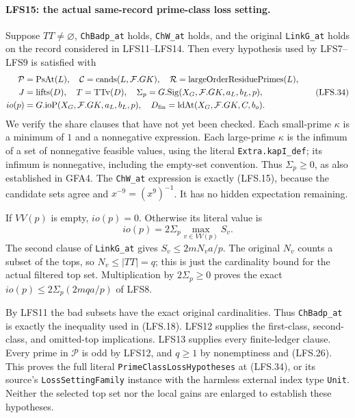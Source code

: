 \paragraph{LFS15: the actual same-record prime-class loss setting.}
\label{claim:LFS15}
Suppose $TT\ne\varnothing$, \texttt{ChBadp\_at} holds,
\texttt{ChW\_at} holds, and the original \texttt{LinkG\_at}
holds on the record considered in LFS11--LFS14.
Then every hypothesis used by LFS7--LFS9 is satisfied with
\[
 \begin{split}
 \mathcal P&=\mathrm{PsAt}(L),\quad
 \mathcal C=\mathrm{cands}(L,\mathcal F.GK),\quad
 \mathcal R=\mathrm{largeOrderResiduePrimes}(L),\\
 J&=\mathrm{lifts}(D),\quad T=\mathrm{TTv}(D),\quad
 \Sigma_p=G.\mathrm{Sig}(X_G,\mathcal F.GK,a_L,b_L,p),\\
 io(p)&=G.\mathrm{ioP}(X_G,\mathcal F.GK,a_L,b_L,p),\quad
 D_{\rm fin}=\mathrm{ldAt}(X_G,\mathcal F.GK,C,b_o).
 \end{split}                                                   \tag{LFS.34}
\]
We verify the share clauses that have not yet been checked.
Each small-prime $\kappa$ is a minimum of $1$ and a
nonnegative expression.  Each large-prime $\kappa$ is the
infimum of a set of nonnegative feasible values, using the
literal \texttt{Extra.kapI\_def}; its infimum is nonnegative,
including the empty-set convention.  Thus $\Sigma_p\ge0$,
as also established in GFA4.  The \texttt{ChW\_at} expression
is exactly (LFS.15), because the candidate sets agree and
$x^{-9}=(x^9)^{-1}$.  It has no hidden expectation remaining.

If $VV(p)$ is empty, $io(p)=0$.  Otherwise its literal value is
\[
             io(p)=2\Sigma_p\max_{v\in VV(p)}S_v.
\]
The second clause of \texttt{LinkG\_at} gives
$S_v\le2mN_va/p$.  The original $N_v$ counts a subset of
the tops, so $N_v\le|TT|=q$; this is just the cardinality
bound for the actual filtered top set.
Multiplication by $2\Sigma_p\ge0$ proves the exact
$io(p)\le2\Sigma_p(2mqa/p)$ of LFS8.

By LFS11 the bad subsets have the exact original cardinalities.
Thus \texttt{ChBadp\_at} is exactly the inequality used in
(LFS.18).  LFS12 supplies the first-class, second-class,
and omitted-top implications.  LFS13 supplies every
finite-ledger clause.  Every prime in $\mathcal P$ is odd
by LFS12, and $q\ge1$ by nonemptiness and (LFS.26).
This proves the full literal \texttt{PrimeClassLossHypotheses}
at (LFS.34), or its source's \texttt{LossSettingFamily}
instance with the harmless external index type \texttt{Unit}.
Neither the selected top set nor the local gains are enlarged
to establish these hypotheses.

